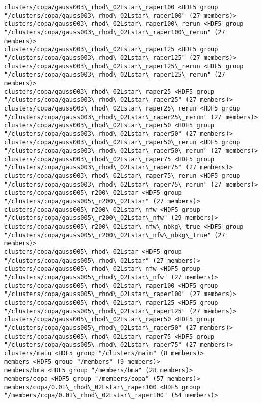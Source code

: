 \documentclass[11pt]{article}
\begin{document}
\begin{Verbatim}[commandchars=\\\{\}]
clusters/copa/gauss003\_rhod\_02Lstar\_raper100 <HDF5 group "/clusters/copa/gauss003\_rhod\_02Lstar\_raper100" (27 members)>
clusters/copa/gauss003\_rhod\_02Lstar\_raper100\_rerun <HDF5 group "/clusters/copa/gauss003\_rhod\_02Lstar\_raper100\_rerun" (27 members)>
clusters/copa/gauss003\_rhod\_02Lstar\_raper125 <HDF5 group "/clusters/copa/gauss003\_rhod\_02Lstar\_raper125" (27 members)>
clusters/copa/gauss003\_rhod\_02Lstar\_raper125\_rerun <HDF5 group "/clusters/copa/gauss003\_rhod\_02Lstar\_raper125\_rerun" (27 members)>
clusters/copa/gauss003\_rhod\_02Lstar\_raper25 <HDF5 group "/clusters/copa/gauss003\_rhod\_02Lstar\_raper25" (27 members)>
clusters/copa/gauss003\_rhod\_02Lstar\_raper25\_rerun <HDF5 group "/clusters/copa/gauss003\_rhod\_02Lstar\_raper25\_rerun" (27 members)>
clusters/copa/gauss003\_rhod\_02Lstar\_raper50 <HDF5 group "/clusters/copa/gauss003\_rhod\_02Lstar\_raper50" (27 members)>
clusters/copa/gauss003\_rhod\_02Lstar\_raper50\_rerun <HDF5 group "/clusters/copa/gauss003\_rhod\_02Lstar\_raper50\_rerun" (27 members)>
clusters/copa/gauss003\_rhod\_02Lstar\_raper75 <HDF5 group "/clusters/copa/gauss003\_rhod\_02Lstar\_raper75" (27 members)>
clusters/copa/gauss003\_rhod\_02Lstar\_raper75\_rerun <HDF5 group "/clusters/copa/gauss003\_rhod\_02Lstar\_raper75\_rerun" (27 members)>
clusters/copa/gauss005\_r200\_02Lstar <HDF5 group "/clusters/copa/gauss005\_r200\_02Lstar" (27 members)>
clusters/copa/gauss005\_r200\_02Lstar\_nfw <HDF5 group "/clusters/copa/gauss005\_r200\_02Lstar\_nfw" (29 members)>
clusters/copa/gauss005\_r200\_02Lstar\_nfw\_nbkg\_true <HDF5 group "/clusters/copa/gauss005\_r200\_02Lstar\_nfw\_nbkg\_true" (27 members)>
clusters/copa/gauss005\_rhod\_02Lstar <HDF5 group "/clusters/copa/gauss005\_rhod\_02Lstar" (27 members)>
clusters/copa/gauss005\_rhod\_02Lstar\_nfw <HDF5 group "/clusters/copa/gauss005\_rhod\_02Lstar\_nfw" (27 members)>
clusters/copa/gauss005\_rhod\_02Lstar\_raper100 <HDF5 group "/clusters/copa/gauss005\_rhod\_02Lstar\_raper100" (27 members)>
clusters/copa/gauss005\_rhod\_02Lstar\_raper125 <HDF5 group "/clusters/copa/gauss005\_rhod\_02Lstar\_raper125" (27 members)>
clusters/copa/gauss005\_rhod\_02Lstar\_raper50 <HDF5 group "/clusters/copa/gauss005\_rhod\_02Lstar\_raper50" (27 members)>
clusters/copa/gauss005\_rhod\_02Lstar\_raper75 <HDF5 group "/clusters/copa/gauss005\_rhod\_02Lstar\_raper75" (27 members)>
clusters/main <HDF5 group "/clusters/main" (8 members)>
members <HDF5 group "/members" (9 members)>
members/bma <HDF5 group "/members/bma" (28 members)>
members/copa <HDF5 group "/members/copa" (57 members)>
members/copa/0.01\_rhod\_02Lstar\_raper100 <HDF5 group "/members/copa/0.01\_rhod\_02Lstar\_raper100" (54 members)>

\end{Verbatim}
\end{document}
